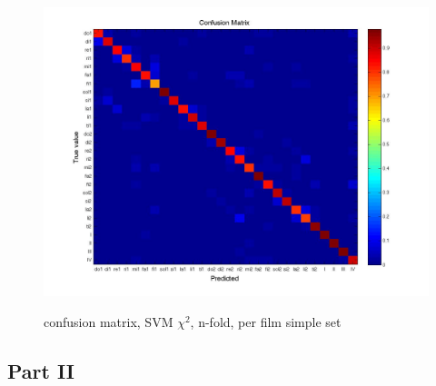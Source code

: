 \begin{figure}[htbp]
\begin{center}
\label{fig:confusion}
\includegraphics[width=\linewidth]{confmat/confusion.jpg}
\end{center}
\caption{confusion matrix, SVM $\chi^2$, n-fold, per film simple set}
\end{figure}




\subsection{Part II}


